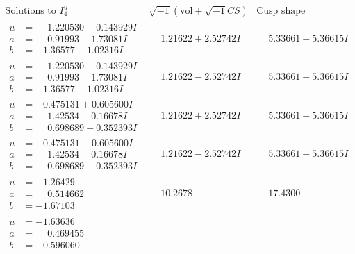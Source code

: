 \documentclass[1p]{elsarticle_modified}
\theoremstyle{definition}
\newcommand{\I}{\sqrt{-1}}
\begin{document}
$$\begin{array}{c|c|c}  
\text{Solutions to }I^u_{4}& \I (\text{vol} + \sqrt{-1}CS) & \text{Cusp shape}\\
 \hline 
\begin{aligned}
u &= \phantom{-}1.220530 + 0.143929 I \\
a &= \phantom{-}0.91993 - 1.73081 I \\
b &= -1.36577 + 1.02316 I\end{aligned}
 & \phantom{-}1.21622 + 2.52742 I & \phantom{-}5.33661 - 5.36615 I \\ \hline\begin{aligned}
u &= \phantom{-}1.220530 - 0.143929 I \\
a &= \phantom{-}0.91993 + 1.73081 I \\
b &= -1.36577 - 1.02316 I\end{aligned}
 & \phantom{-}1.21622 - 2.52742 I & \phantom{-}5.33661 + 5.36615 I \\ \hline\begin{aligned}
u &= -0.475131 + 0.605600 I \\
a &= \phantom{-}1.42534 + 0.16678 I \\
b &= \phantom{-}0.698689 - 0.352393 I\end{aligned}
 & \phantom{-}1.21622 + 2.52742 I & \phantom{-}5.33661 - 5.36615 I \\ \hline\begin{aligned}
u &= -0.475131 - 0.605600 I \\
a &= \phantom{-}1.42534 - 0.16678 I \\
b &= \phantom{-}0.698689 + 0.352393 I\end{aligned}
 & \phantom{-}1.21622 - 2.52742 I & \phantom{-}5.33661 + 5.36615 I \\ \hline\begin{aligned}
u &= -1.26429\phantom{ +0.000000I} \\
a &= \phantom{-}0.514662\phantom{ +0.000000I} \\
b &= -1.67103\phantom{ +0.000000I}\end{aligned}
 & \phantom{-}10.2678\phantom{ +0.000000I} & \phantom{-}17.4300\phantom{ +0.000000I} \\ \hline\begin{aligned}
u &= -1.63636\phantom{ +0.000000I} \\
a &= \phantom{-}0.469455\phantom{ +0.000000I} \\
b &= -0.596060\phantom{ +0.000000I}\end{aligned}

\end{array}$$
\end{document}
